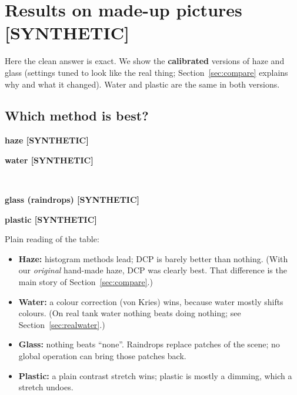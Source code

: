\documentclass[10pt,a4paper]{article}
\newcommand{\tablein}[1]{}
\newcommand{\SYN}{\textcolor{orange!85!black}{\textbf{[SYNTHETIC]}}}
\begin{document}
\section{Results on made-up pictures \SYN}
\label{sec:synthetic}
Here the clean answer is exact. We show the \textbf{calibrated} versions of haze and glass (settings tuned to look like the real thing; Section~\ref{sec:compare} explains why and what it changed). Water and plastic are the same in both versions.

\subsection{Which method is best?}
\begin{table}[H]\centering\scriptsize
\begin{minipage}{.48\textwidth}\centering\textbf{haze \SYN}\\\tablein{matched_haze}\end{minipage}\hfill
\begin{minipage}{.48\textwidth}\centering\textbf{water \SYN}\\\tablein{matched_water}\end{minipage}\\[6pt]
\begin{minipage}{.48\textwidth}\centering\textbf{glass (raindrops) \SYN}\\\tablein{matched_glass}\end{minipage}\hfill
\begin{minipage}{.48\textwidth}\centering\textbf{plastic \SYN}\\\tablein{matched_plastic}\end{minipage}
\caption{\SYN\ The best methods per medium (PSNR averaged over the made-up pairs; ``vs none'' is the gain over doing nothing).}\end{table}

Plain reading of the table:
\begin{itemize}
\item \textbf{Haze:} histogram methods lead; DCP is barely better than nothing. (With our \emph{original} hand-made haze, DCP was clearly best. That difference is the main story of Section~\ref{sec:compare}.)
\item \textbf{Water:} a colour correction (von Kries) wins, because water mostly shifts colours. (On real tank water nothing beats doing nothing; see Section~\ref{sec:realwater}.)
\item \textbf{Glass:} nothing beats ``none''. Raindrops replace patches of the scene; no global operation can bring those patches back.
\item \textbf{Plastic:} a plain contrast stretch wins; plastic is mostly a dimming, which a stretch undoes.
\end{itemize}
\end{document}
